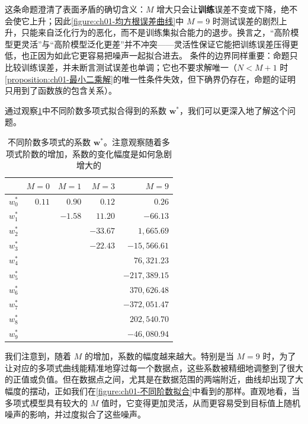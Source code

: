 \documentclass[../../main.tex]{subfiles}
\begin{document}
\begin{remark}
这条命题澄清了表面矛盾的确切含义：$M$ 增大只会让\textbf{训练}误差不变或下降，绝不会使它上升；因此\cref{figure:ch01-均方根误差曲线}中 $M=9$ 时测试误差的剧烈上升，只能来自泛化行为的恶化，而不是训练集拟合能力的退步。换言之，“高阶模型更灵活”与“高阶模型泛化更差”并不冲突——灵活性保证它能把训练误差压得更低，也正因为如此它更容易把噪声一起拟合进去。
条件的边界同样重要：命题只比较训练误差，并未断言测试误差也单调；它也不要求解唯一（$N<M+1$ 时\cref{proposition:ch01-最小二乘解}的唯一性条件失效，但下确界仍存在，命题的证明只用到了函数族的包含关系）。
\end{remark}

通过观察\cref{table:ch01-多项式系数}中不同阶数多项式拟合得到的系数 $\mathbf{w}^{*}$，我们可以更深入地了解这个问题。

\begin{table}[htbp]
  \centering
  \caption{不同阶数多项式的系数 $\mathbf{w}^{*}$。注意观察随着多项式阶数的增加，系数的变化幅度是如何急剧增大的}
  \label{table:ch01-多项式系数}
  \begin{tabular}{c *{4}{r}}
    \toprule
     & $M=0$ & $M=1$ & $M=3$ & $M=9$ \\
    \midrule
    $w_0^{*}$ & $0.11$ & $0.90$ & $0.12$ & $0.26$ \\
    $w_1^{*}$ &  & $-1.58$ & $11.20$ & $-66.13$ \\
    $w_2^{*}$ &  &  & $-33.67$ & $1{,}665.69$ \\
    $w_3^{*}$ &  &  & $-22.43$ & $-15{,}566.61$ \\
    $w_4^{*}$ &  &  &  & $76{,}321.23$ \\
    $w_5^{*}$ &  &  &  & $-217{,}389.15$ \\
    $w_6^{*}$ &  &  &  & $370{,}626.48$ \\
    $w_7^{*}$ &  &  &  & $-372{,}051.47$ \\
    $w_8^{*}$ &  &  &  & $202{,}540.70$ \\
    $w_9^{*}$ &  &  &  & $-46{,}080.94$ \\
    \bottomrule
  \end{tabular}
\end{table}

我们注意到，随着 $M$ 的增加，系数的幅度越来越大。特别是当 $M=9$ 时，为了让对应的多项式曲线能精准地穿过每一个数据点，这些系数被精细地调整到了很大的正值或负值。但在数据点之间，尤其是在数据范围的两端附近，曲线却出现了大幅度的摆动，正如我们在\cref{figure:ch01-不同阶数拟合}中看到的那样。直观地看，当多项式模型具有较大的 $M$ 值时，它变得更加灵活，从而更容易受到目标值上随机噪声的影响，并过度拟合了这些噪声。
\end{document}
